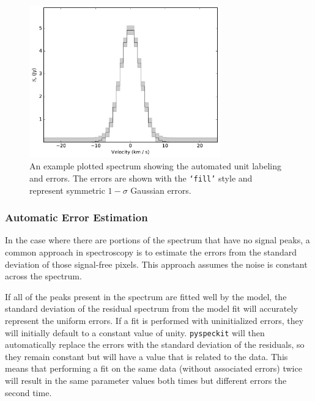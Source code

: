 \documentclass[twocolumn]{aastex63}
\newcommand{\pyspeckit}{\texttt{pyspeckit}\xspace}
\begin{document}
\begin{figure}[!htp]
\includegraphics[scale=1,width=3.25in]{example_fig_1.pdf}
\caption{An example plotted spectrum showing the automated unit labeling
and errors.  The errors are shown with the \texttt{`fill'} style
and represent symmetric $1-\sigma$ Gaussian errors.  }
\label{fig:example1}
\end{figure}




\subsubsection{Automatic Error Estimation}
\label{sec:autoerror}
In the case where there are portions of the spectrum that have no
signal peaks, a common approach in spectroscopy is to estimate the
errors from the standard deviation of those signal-free pixels.  This approach
assumes the noise is constant across the spectrum.

If all of the peaks present
in the spectrum are fitted well by the model,
the standard deviation of the residual spectrum from the model fit will
accurately represent the uniform errors.     If a fit is performed with
uninitialized errors, they will initially default to a constant value of unity. 
\pyspeckit will then automatically replace the errors with the
standard deviation of the residuals, so they remain constant but will have a value that is related to the data.
This means that performing a fit on the
same data (without associated errors) twice will result in the same parameter
values both times but different errors the second time.
\end{document}
